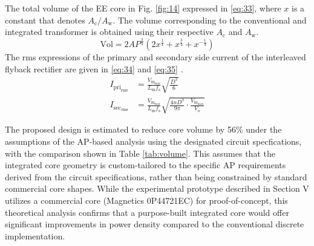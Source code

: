 \documentclass[lettersize,journal]{IEEEtran}
\begin{document}
The total volume of the EE core in Fig. \ref{fig:14} expressed in \eqref{eq:33}, where $x$ is a constant that denotes $A_{\mathrm{c}}/A_{\mathrm{w}}$. The volume corresponding to the conventional and integrated transformer is obtained using their respective $A_{\mathrm{c}}$ and $A_{\mathrm{w}}$.
\begin{equation}
\label{eq:33}
\mathrm{Vol} = 2 AP^{\frac{3}{4}} (2 x^{\frac{1}{4}} + x^{\frac{3}{4}} + x^{-\frac{1}{4}})
\end{equation}
The rms expressions of the primary and secondary side current of the interleaved flyback rectifier are given in \eqref{eq:34} and \eqref{eq:35} \cite{ref8}.
\begin{align}
I_{\mathrm{pri}_{\mathrm{rms}}} &= \frac{V_{\mathrm{in}_{\mathrm{max}}}}{L_{\mathrm{m}} f_{\mathrm{s}}} \sqrt{\frac{D^3}{6}} \label{eq:34}\\
I_{\mathrm{sec}_{\mathrm{rms}}} &= \frac{V_{\mathrm{in}_{\mathrm{max}}}}{L_{\mathrm{m}} f_{\mathrm{s}}} \sqrt{\frac{4 n D^3}{9 \pi} \cdot \frac{V_{\mathrm{in}_{\mathrm{max}}}}{V_{\mathrm{o}}}} \label{eq:35}
\end{align}

The proposed design is estimated to reduce core volume by 56\% under the assumptions of the AP-based analysis using the designated circuit specfications, with the comparison shown in Table \ref{tab:volume}. This assumes that the integrated core geometry is custom-tailored to the specific AP requirements derived from the circuit specifications, rather than being constrained by standard commercial core shapes. While the experimental prototype described in Section V utilizes a commercial core (Magnetics 0P44721EC) for proof-of-concept, this theoretical analysis confirms that a purpose-built integrated core would offer significant improvements in power density compared to the conventional discrete implementation.
\end{document}
